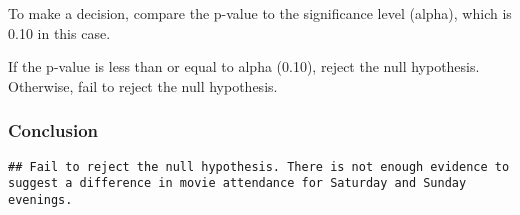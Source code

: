 \documentclass[
]{article}
\newenvironment{Shaded}{\begin{snugshade}}{\end{snugshade}}
\newcommand{\ControlFlowTok}[1]{\textcolor[rgb]{0.13,0.29,0.53}{\textbf{#1}}}
\newcommand{\FloatTok}[1]{\textcolor[rgb]{0.00,0.00,0.81}{#1}}
\newcommand{\FunctionTok}[1]{\textcolor[rgb]{0.00,0.00,0.00}{#1}}
\newcommand{\NormalTok}[1]{#1}
\newcommand{\OtherTok}[1]{\textcolor[rgb]{0.56,0.35,0.01}{#1}}
\newcommand{\SpecialCharTok}[1]{\textcolor[rgb]{0.00,0.00,0.00}{#1}}
\newcommand{\StringTok}[1]{\textcolor[rgb]{0.31,0.60,0.02}{#1}}
\begin{document}
To make a decision, compare the p-value to the significance level
(alpha), which is 0.10 in this case.

If the p-value is less than or equal to alpha (0.10), reject the null
hypothesis. Otherwise, fail to reject the null hypothesis.

\hypertarget{conclusion-1}{%
\subsubsection{Conclusion}\label{conclusion-1}}

\begin{Shaded}
\end{Shaded}

\begin{verbatim}
## Fail to reject the null hypothesis. There is not enough evidence to suggest a difference in movie attendance for Saturday and Sunday evenings.
\end{verbatim}
\end{document}
